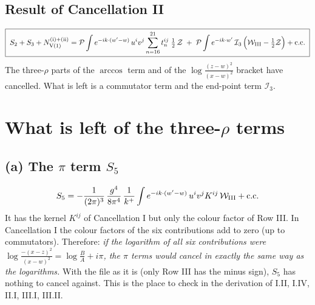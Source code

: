 \documentclass[10pt]{article}
\numberwithin{equation}{section}
\begin{document}
\subsection{Result of Cancellation II}
\begin{align}
\boxed{\;S_{2}+S_{3}+N_{\rm V(1)}^{\rm (i)+(ii)}
=\mathcal{P}\int e^{-ik\cdot(w'-w)}\,u^{i}v^{j}\sum_{n=16}^{21}t_{n}^{ij}\;\tfrac12\,\mathcal{Z}
\;+\;\mathcal{P}\int e^{-ik\cdot w'}\,\mathcal{I}_{3}\,\Big(\mathcal{W}_{\rm III}-\tfrac12\mathcal{Z}\Big)+{\rm c.c.}\;} \label{eq:IIresult}
\end{align}
The three-$\rho$ parts of the $\arccos$ term and of the $\log\frac{(z-w)^{2}}{(x-w)^{2}}$ bracket have cancelled. What is left is a commutator term and the end-point term $\mathcal{I}_{3}$.

\section{What is left of the three-$\rho$ terms}\label{sec:left}

\subsection{(a) The $\pi$ term $S_{5}$}
\begin{align}
S_{5}=-\frac{1}{(2\pi)^{3}}\,\frac{g^{4}}{8\pi^{4}}\,\frac{1}{k^{+}}\int e^{-ik\cdot(w'-w)}\,u^{i}v^{j}K^{ij}\,\mathcal{W}_{\rm III}+{\rm c.c.}
\end{align}
It has the kernel $K^{ij}$ of Cancellation I but only the colour factor of Row III. In Cancellation I the colour factors of the six contributions add to zero (up to commutators). Therefore: \emph{if the logarithm of all six contributions were $\log\frac{-(x-z)^{2}}{(x-w)^{2}}=\log\frac{B}{A}+i\pi$, the $\pi$ terms would cancel in exactly the same way as the logarithms.} With the file as it is (only Row III has the minus sign), $S_{5}$ has nothing to cancel against. This is the place to check in the derivation of I.II, I.IV, II.I, III.I, III.II.
\end{document}
